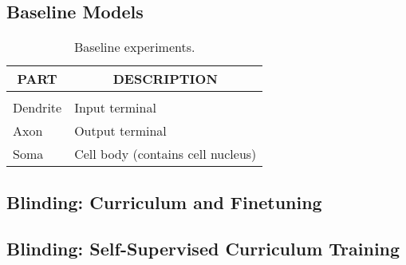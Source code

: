 %

\subsection{Baseline Models}
\begin{table}[h]
    \label{sample-table}
    \begin{center}
        \begin{tabular}{ll}
            \multicolumn{1}{c}{\bf PART}  &\multicolumn{1}{c}{\bf DESCRIPTION}
            \\ \hline \\
            Dendrite         &Input terminal \\
            Axon             &Output terminal \\
            Soma             &Cell body (contains cell nucleus) \\
        \end{tabular}
    \end{center}
    \caption{Baseline experiments.}
\end{table}


\subsection{Blinding: Curriculum and Finetuning}

\subsection{Blinding: Self-Supervised Curriculum Training}

